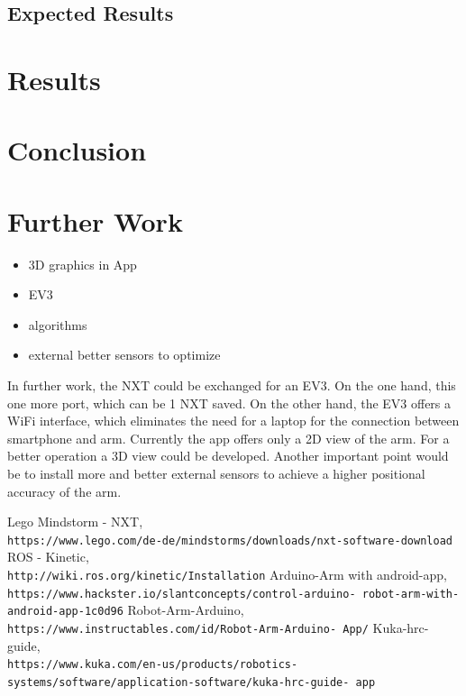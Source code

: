 \documentclass[conference]{IEEEtran}
\begin{document}
\subsection{Expected Results}\label{sec:expectedresults}

\section{Results}

\section{Conclusion}

\section{Further Work}
\begin{itemize}
	\item 3D graphics in App
	\item EV3
	\item algorithms
	\item external better sensors to optimize
\end{itemize}
In further work, the NXT could be exchanged for an EV3. On the one hand, this one more port, which can be 1 NXT saved. On the other hand, the EV3 offers a WiFi interface, which eliminates the need for a laptop for the connection between smartphone and arm.
Currently the app offers only a 2D view of the arm. For a better operation a 3D view could be developed.
Another important point would be to install more and better external sensors to achieve a higher positional accuracy of the arm.

\begin{thebibliography}{00}
Lego Mindstorm - NXT,
\\\texttt{https://www.lego.com/de-de/mindstorms/downloads/nxt-software-download}
ROS - Kinetic,
\\\texttt{http://wiki.ros.org/kinetic/Installation}
Arduino-Arm with android-app,
\\\texttt{https://www.hackster.io/slantconcepts/control-arduino-
	robot-arm-with-android-app-1c0d96}
Robot-Arm-Arduino,
\\\texttt{https://www.instructables.com/id/Robot-Arm-Arduino-
	App/}
Kuka-hrc-guide,
\\\texttt{https://www.kuka.com/en-us/products/robotics-
	systems/software/application-software/kuka-hrc-guide-
	app}
\end{thebibliography}

\listoftodos
\end{document}
